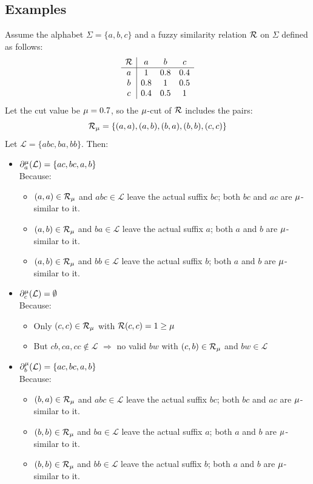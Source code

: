 \subsection*{Examples}
Assume the alphabet $\Sigma = \{a, b, c\}$ and a fuzzy similarity relation ${\mathcal R}$ on $\Sigma$ defined as follows:
\[
\begin{array}{c|ccc}
{\mathcal R} & a & b & c \\
\hline
a & 1 & 0.8 & 0.4 \\
b & 0.8 & 1 & 0.5 \\
c & 0.4 & 0.5 & 1 \\
\end{array}
\]
Let the cut value be $\mu = 0.7$, so the $\mu$-cut of ${\mathcal R}$ includes the pairs:
\[
{\mathcal R}_\mu = \{(a, a), (a, b), (b, a), (b, b), (c, c)\}
\]
\noindent
Let $\mathcal{L} = \{abc, ba, bb\}$. Then:
\begin{itemize}
    \item $\partial_a^\mu(\mathcal{L}) = \{ac, bc, a, b\}$\\
    Because:
    \begin{itemize}
        \item $(a,a) \in {\mathcal R}_\mu$ and $abc \in \mathcal{L}$ leave the actual suffix $bc$; both $bc$ and $ac$ are $\mu$-similar to it.
        \item $(a,b) \in {\mathcal R}_\mu$ and $ba \in \mathcal{L}$ leave the actual suffix $a$; both $a$ and $b$ are $\mu$-similar to it.
        \item $(a,b) \in {\mathcal R}_\mu$ and $bb \in \mathcal{L}$ leave the actual suffix $b$; both $a$ and $b$ are $\mu$-similar to it.
    \end{itemize}

    \item $\partial_c^\mu(\mathcal{L}) = \emptyset$\\
    Because:
    \begin{itemize}
        \item Only $(c,c) \in {\mathcal R}_\mu$ with ${\mathcal R}(c,c) = 1 \ge \mu$
        \item But $cb, ca, cc \notin \mathcal{L}$ $\Rightarrow$ no valid $bw$ with $(c,b) \in {\mathcal R}_\mu$ and $bw \in \mathcal{L}$
    \end{itemize}

    \item $\partial_b^\mu(\mathcal{L}) = \{ac, bc, a, b\}$\\
    Because:
    \begin{itemize}
        \item $(b,a) \in {\mathcal R}_\mu$ and $abc \in \mathcal{L}$ leave the actual suffix $bc$; both $bc$ and $ac$ are $\mu$-similar to it.
        \item $(b,b) \in {\mathcal R}_\mu$ and $ba \in \mathcal{L}$ leave the actual suffix $a$; both $a$ and $b$ are $\mu$-similar to it.
        \item $(b,b) \in {\mathcal R}_\mu$ and $bb \in \mathcal{L}$ leave the actual suffix $b$; both $a$ and $b$ are $\mu$-similar to it.
    \end{itemize}
\end{itemize}

